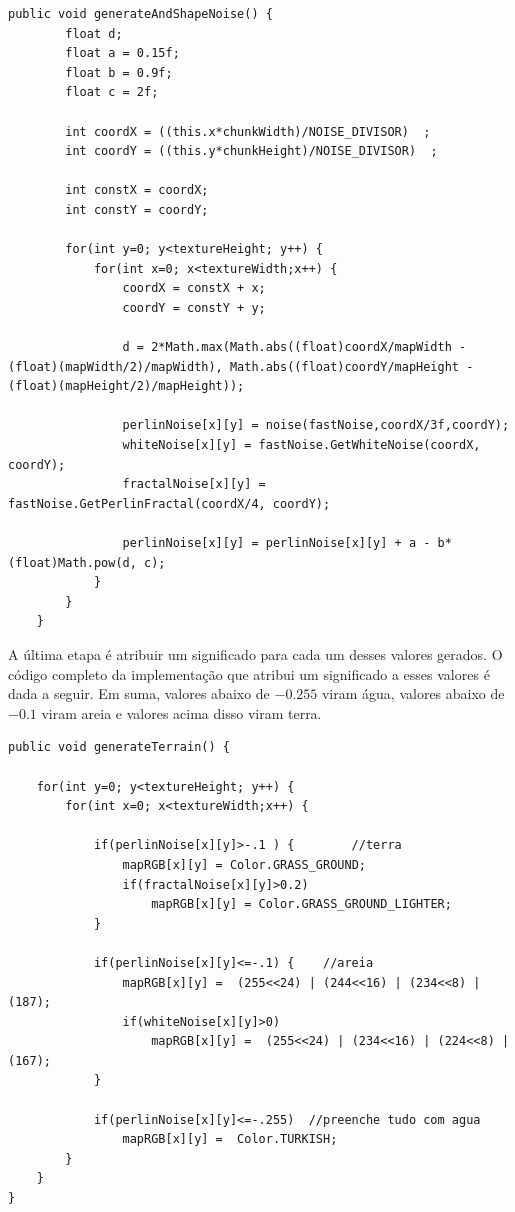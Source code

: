 \documentclass[12pt, 
openright, 
oneside, 
a4paper,    
brazil]{facom-ufu-abntex2}
\begin{document}
\begin{lstlisting}[caption=Implementação que gera e molda o ruído, label={alg:modelaRuido}]
public void generateAndShapeNoise() {
		float d;
		float a = 0.15f;
		float b = 0.9f;
		float c = 2f;
		
		int coordX = ((this.x*chunkWidth)/NOISE_DIVISOR)  ;
		int coordY = ((this.y*chunkHeight)/NOISE_DIVISOR)  ;

		int constX = coordX;
		int constY = coordY;
		
		for(int y=0; y<textureHeight; y++) {
			for(int x=0; x<textureWidth;x++) {
				coordX = constX + x;
				coordY = constY + y;
				
				d = 2*Math.max(Math.abs((float)coordX/mapWidth - (float)(mapWidth/2)/mapWidth), Math.abs((float)coordY/mapHeight - (float)(mapHeight/2)/mapHeight));
				
				perlinNoise[x][y] = noise(fastNoise,coordX/3f,coordY);
				whiteNoise[x][y] = fastNoise.GetWhiteNoise(coordX, coordY); 
				fractalNoise[x][y] = fastNoise.GetPerlinFractal(coordX/4, coordY); 
				
				perlinNoise[x][y] = perlinNoise[x][y] + a - b*(float)Math.pow(d, c);
			}
		}
	}
\end{lstlisting}  

A última etapa é atribuir um significado para cada um desses valores gerados. O código completo da implementação que atribui um significado a esses valores é dada a seguir. Em suma, valores abaixo de $-0.255$  viram água, valores abaixo de $-0.1$ viram areia e valores acima disso viram terra.

\begin{lstlisting}[caption=Implementação que gera a textura final do terreno]
public void generateTerrain() {

	for(int y=0; y<textureHeight; y++) {
		for(int x=0; x<textureWidth;x++) {
			
			if(perlinNoise[x][y]>-.1 ) { 		//terra
				mapRGB[x][y] = Color.GRASS_GROUND;
				if(fractalNoise[x][y]>0.2)
					mapRGB[x][y] = Color.GRASS_GROUND_LIGHTER;
			}
			
			if(perlinNoise[x][y]<=-.1) {	//areia
				mapRGB[x][y] =  (255<<24) | (244<<16) | (234<<8) | (187);
				if(whiteNoise[x][y]>0)
					mapRGB[x][y] =  (255<<24) | (234<<16) | (224<<8) | (167);
			}
			
			if(perlinNoise[x][y]<=-.255)  //preenche tudo com agua
				mapRGB[x][y] = 	Color.TURKISH;
		}
	}
}
\end{lstlisting}    
\end{document}
